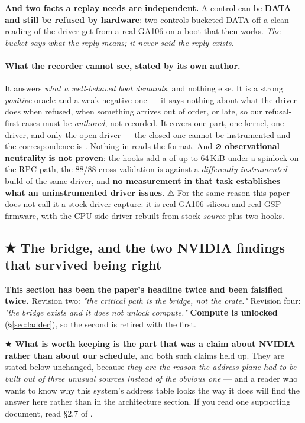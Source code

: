 \documentclass[10.5pt]{article}
\begin{document}
\textbf{And two facts a replay needs are independent.} A control can be \textbf{DATA and still be
refused by hardware}: two controls bucketed DATA off a clean reading of the driver get
 from a real GA106 on a boot that then works. \emph{The bucket says
what the reply means; it never said the reply exists.}

\paragraph{What the recorder cannot see, stated by its own author.} It answers \emph{what a
well-behaved boot demands}, and nothing else. It is a strong \emph{positive} oracle and a weak
negative one — it says nothing about what the driver does when refused, when something arrives
out of order, or late, so our refusal-first cases must be \emph{authored}, not recorded. It
covers one part, one kernel, one driver, and only the open driver — the closed one cannot be
instrumented and the correspondence is \assumed{}. Nothing in  reads the format.
And ⊘ \textbf{observational neutrality is not proven}: the hooks add a  of up to
64\,KiB under a spinlock on the RPC path, the 88/88 cross-validation is against a
\emph{differently instrumented} build of the same driver, and \textbf{no measurement in that task
establishes what an uninstrumented driver issues}. ⚠ For the same reason this paper does not call
it a stock-driver capture: it is real GA106 silicon and real GSP firmware, with the CPU-side
driver rebuilt from stock \emph{source} plus two hooks.

\subsection{\texorpdfstring{★ The bridge, and the two NVIDIA findings that survived being right}{The bridge, and the two NVIDIA findings that survived being right}}
\label{sec:bridge}

\begin{claimbox}\small
\textbf{This section has been the paper's headline twice and been falsified twice.} Revision two:
\emph{"the critical path is the bridge, not the crate."} Revision four: \emph{"the bridge exists
and it does \emph{not} unlock compute."} \textbf{Compute is unlocked} (\S\ref{sec:ladder}), so the
second is retired with the first.

\smallskip
★ \textbf{What is worth keeping is the part that was a claim about NVIDIA rather than about our
schedule}, and both such claims held up. They are stated below unchanged, because \emph{they are
the reason the address plane had to be built out of three unusual sources instead of the obvious
one} — and a reader who wants to know why this system's address table looks the way it does will
find the answer here rather than in the architecture section. If you read one supporting document,
read \S2.7 of .
\end{claimbox}
\end{document}
